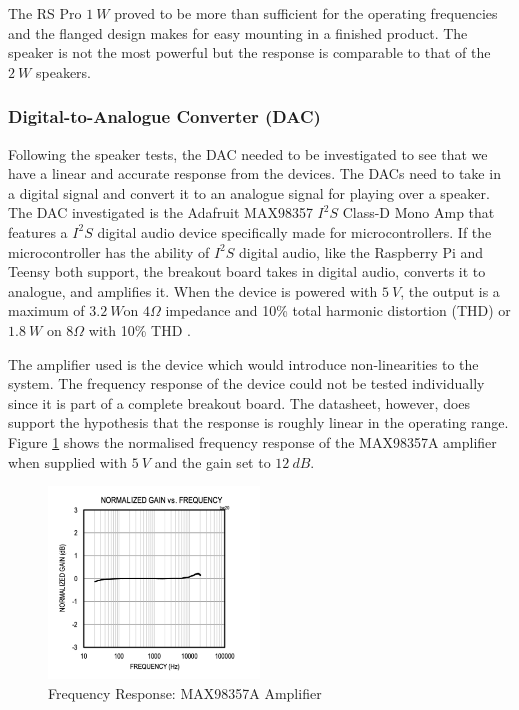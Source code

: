 The RS Pro $1\ W$ proved to be more than sufficient for the operating frequencies and the flanged design makes for easy mounting in a finished product. The speaker is not the most powerful but the response is comparable to that of the $2\ W$ speakers.

\subsubsection{Digital-to-Analogue Converter (DAC)}

Following the speaker tests, the DAC needed to be investigated to see that we have a linear and accurate response from the devices. The  DACs need to take in a digital signal and convert it to an analogue signal for playing over a speaker. The DAC investigated is the Adafruit MAX98357 $I^2S$ Class-D Mono Amp that features a $I^2 S$ digital audio device specifically made for microcontrollers. If the microcontroller has the ability of $I^2 S$ digital audio, like the Raspberry Pi and Teensy both support, the breakout board takes in digital audio, converts it to analogue, and amplifies it. When the device is powered with $5\ V$, the output is a maximum of $3.2\ W$on $4 \Omega$ impedance and 10\% total harmonic distortion (THD) or $1.8\ W$ on $8 \Omega$ with 10\% THD \cite{noauthor_adafruit_nodate}. 

The amplifier used is the device which would introduce non-linearities to the system. The frequency response of the device could not be tested individually since it is part of a complete breakout board. The datasheet, however, does support the hypothesis that the response is roughly linear in the operating range. Figure \ref{fig:ampfreq} shows the normalised frequency response of the MAX98357A amplifier when supplied with $5\ V$ and the gain set to $12\ dB$.
\begin{figure}[h!]
    \centering
    \includegraphics[width = 0.5\textwidth]{images/ampfreq.pdf}
    \caption{Frequency Response: MAX98357A Amplifier \cite{noauthor_max98357a_2019}}\label{fig:ampfreq}
\end{figure}


